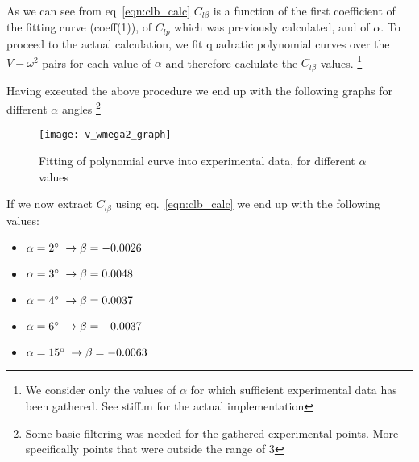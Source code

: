 As we can see from eq~\ref{eqn:clb_calc} $C_{l\beta}$ is a function of the 
first coefficient of the fitting curve (coeff(1)), of $C_{lp}$ which was previously
calculated, and of $\alpha$. To proceed to the actual calculation, 
we fit quadratic polynomial curves over the $V-\omega^2$ pairs for each value of $\alpha$
and therefore caclulate the $C_{l\beta}$ values.
\footnote{We consider only the values of $\alpha$ for which sufficient experimental data has been gathered.
See stiff.m for the actual implementation}

Having executed the above procedure we end up with the following graphs 
for different $\alpha$ angles
\footnote{Some basic filtering was needed for the gathered experimental points. 
More specifically points that were outside the range of 3}

\begin{figure}[H]
    \begin{center}
        \texttt{[image: v\_wmega2\_graph]} %
    \end{center}
    \caption{Fitting of polynomial curve into experimental data, for different $\alpha$ values}
    \label{fig:v_wmega2_graph}
\end{figure}

If we now extract $C_{l\beta}$ using eq.~\ref{eqn:clb_calc} we end up with the 
following values:

\begin{itemize}
    \item $\alpha = 2\degree\; \rightarrow \beta  = -0.0026$
    \item $\alpha = 3\degree\; \rightarrow \beta  = 0.0048$
    \item $\alpha = 4\degree\; \rightarrow \beta  = 0.0037$
    \item $\alpha = 6\degree\; \rightarrow \beta  = -0.0037$
    \item $\alpha = 15\degree\; \rightarrow \beta  = -0.0063$
\end{itemize}


